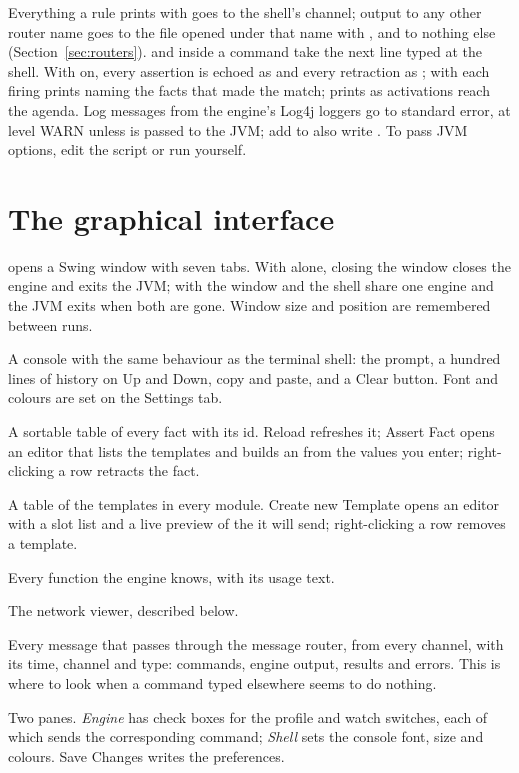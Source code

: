Everything a rule prints with  goes to the shell's
channel; output to any other router name goes to the file opened under
that name with , and to nothing else
(Section~\ref{sec:routers}).  and  inside a
command take the next line typed at the shell. With  on, every assertion is echoed as
 and every retraction as ; with
 each firing prints
 naming the facts that made the
match;  prints  as
activations reach the agenda. Log messages from the engine's Log4j
loggers go to standard error, at level WARN unless
 is passed to the JVM; add
 to also write
. To pass JVM options, edit the 
script or run  yourself.

\section{The graphical interface}

 opens a Swing window with seven tabs. With
 alone, closing the window closes the engine and exits the JVM;
with  the window and the shell share one engine and the
JVM exits when both are gone. Window size and position are remembered
between runs.

\begin{description}[style=nextline]
\item[Shell] A console with the same behaviour as the terminal shell:
  the  prompt, a hundred lines of history on Up and Down,
  copy and paste, and a Clear button. Font and colours are set on the
  Settings tab.
\item[Facts] A sortable table of every fact with its id. Reload refreshes
  it; Assert Fact opens an editor that lists the templates and builds an
   from the values you enter; right-clicking a row retracts
  the fact.
\item[Templates] A table of the templates in every module. Create new
  Template opens an editor with a slot list and a live preview of the
   it will send; right-clicking a row removes a
  template.
\item[Functions] Every function the engine knows, with its usage text.
\item[Rete] The network viewer, described below.
\item[Log] Every message that passes through the message router, from
  every channel, with its time, channel and type: commands, engine
  output, results and errors. This is where to look when a command
  typed elsewhere seems to do nothing.
\item[Settings] Two panes. \emph{Engine} has check boxes for the profile
  and watch switches, each of which sends the corresponding command;
  \emph{Shell} sets the console font, size and colours. Save Changes
  writes the preferences.
\end{description}

